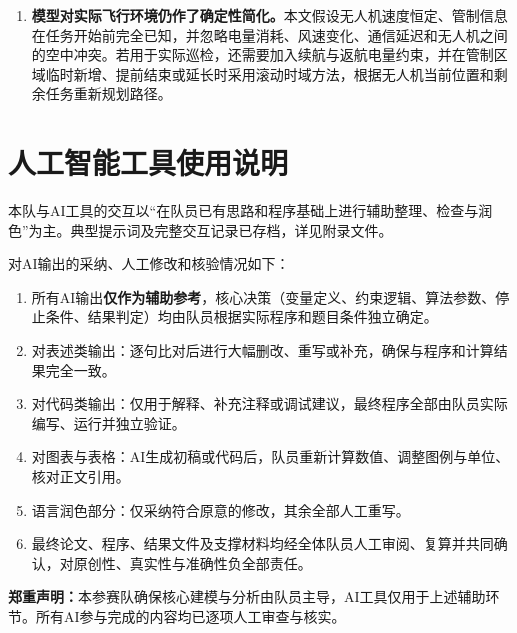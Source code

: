 \documentclass[UTF8,a4paper,12pt]{ctexart}
\numberwithin{equation}{section}
\numberwithin{equation}{section}
\begin{document}
\begin{enumerate}[label=（\arabic*）]
  \item \textbf{模型对实际飞行环境仍作了确定性简化。}本文假设无人机速度恒定、管制信息在任务开始前完全已知，并忽略电量消耗、风速变化、通信延迟和无人机之间的空中冲突。若用于实际巡检，还需要加入续航与返航电量约束，并在管制区域临时新增、提前结束或延长时采用滚动时域方法，根据无人机当前位置和剩余任务重新规划路径\cite{adamo2024}。
\end{enumerate}

\clearpage
\nocite{*}



\clearpage
\section*{人工智能工具使用说明}

本队与AI工具的交互以“在队员已有思路和程序基础上进行辅助整理、检查与润色”为主。典型提示词及完整交互记录已存档，详见附录文件。

\noindent 对AI输出的采纳、人工修改和核验情况如下：

\begin{enumerate}[label=\arabic*.]
  \item 所有AI输出\textbf{仅作为辅助参考}，核心决策（变量定义、约束逻辑、算法参数、停止条件、结果判定）均由队员根据实际程序和题目条件独立确定。
  \item 对表述类输出：逐句比对后进行大幅删改、重写或补充，确保与程序和计算结果完全一致。
  \item 对代码类输出：仅用于解释、补充注释或调试建议，最终程序全部由队员实际编写、运行并独立验证。
  \item 对图表与表格：AI生成初稿或代码后，队员重新计算数值、调整图例与单位、核对正文引用。
  \item 语言润色部分：仅采纳符合原意的修改，其余全部人工重写。
  \item 最终论文、程序、结果文件及支撑材料均经全体队员人工审阅、复算并共同确认，对原创性、真实性与准确性负全部责任。
\end{enumerate}

\noindent\textbf{郑重声明：}本参赛队确保核心建模与分析由队员主导，AI工具仅用于上述辅助环节。所有AI参与完成的内容均已逐项人工审查与核实。
\end{document}
